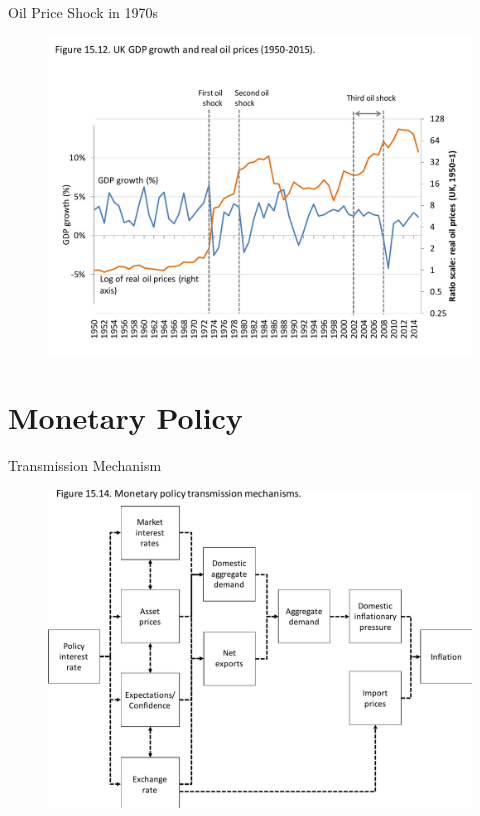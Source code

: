 \documentclass[11pt,aspectratio=43,usenames,dvipsnames]{beamer}
\theoremstyle{definition}
\begin{document}
\begin{frame}{Oil Price Shock in 1970s}
\label{slide:Oil_Price_Shock_in_1970s}
    \begin{figure}
        \centering
        \includegraphics[width=.9\textwidth]{./figures/15.pdf}
    \end{figure}

\end{frame}

\section[Mone]{Monetary Policy}
\label{sec:Monetary_Policy}


\begin{frame}{Transmission Mechanism}
\label{slide:Transmission_Mechanism}
    \begin{figure}
        \centering
        \includegraphics[width=.8\textwidth]{./figures/17.pdf}
    \end{figure}

\end{frame}
\end{document}
